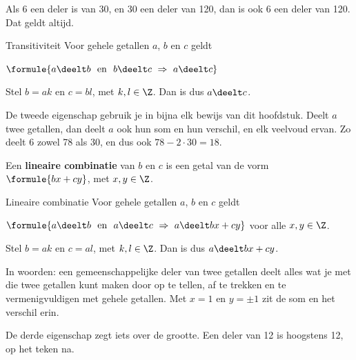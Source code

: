 Als 6 een deler is van 30, en 30 een deler van 120, dan is ook 6 een deler van 120. Dat geldt altijd.

\begin{theorie}
\begin{stelling}{Transitiviteit}
Voor gehele getallen $a$, $b$ en $c$ geldt

\vspace{1mm}
\qquad $\formule{a \deelt b \ \text{ en } \ b \deelt c \ \Rightarrow \ a \deelt c}$
\end{stelling}

\begin{bewijs}
Stel $b = ak$ en $c = bl$, met $k, l \in \Z$. Dan is
dus $a \deelt c$.
\end{bewijs}
\end{theorie}

De tweede eigenschap gebruik je in bijna elk bewijs van dit hoofdstuk. Deelt $a$ twee getallen, dan deelt $a$ ook hun som en hun verschil, en elk veelvoud ervan. Zo deelt 6 zowel 78 als 30, en dus ook $78 - 2 \cdot 30 = 18$.

\begin{theorie}
Een \textbf{\textcolor{accent}{lineaire combinatie}} van $b$ en $c$ is een getal van de vorm $\formule{bx + cy}$, met $x, y \in \Z$.

\begin{stelling}{Lineaire combinatie}
Voor gehele getallen $a$, $b$ en $c$ geldt

\vspace{1mm}
\qquad $\formule{a \deelt b \ \text{ en } \ a \deelt c \ \Rightarrow \ a \deelt bx + cy}$ \qquad voor alle $x, y \in \Z$.
\end{stelling}

\begin{bewijs}
Stel $b = ak$ en $c = al$, met $k, l \in \Z$. Dan is
dus $a \deelt bx + cy$.
\end{bewijs}
\end{theorie}

In woorden: een gemeenschappelijke deler van twee getallen deelt alles wat je met die twee getallen kunt maken door op te tellen, af te trekken en te vermenigvuldigen met gehele getallen. Met $x = 1$ en $y = \pm 1$ zit de som en het verschil erin.

De derde eigenschap zegt iets over de grootte. Een deler van 12 is hoogstens 12, op het teken na.

